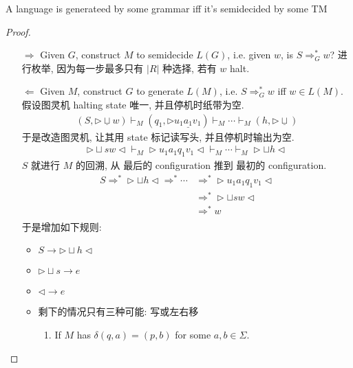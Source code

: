 \begin{theorem}
    A language is generateed by some grammar iff it's semidecided by some TM
\end{theorem}
\begin{proof}\quad
    \begin{itemize}
        \item [$\Rightarrow$] Given $G$, construct $M$ to semidecide $L(G)$, i.e. given $w$, is $S\Rightarrow_G^* w$?
        \subitem 进行枚举, 因为每一步最多只有 $|R|$ 种选择, 若有 $w$ halt. 
        \item [$\Leftarrow$] Given $M$, construct $G$ to generate $L(M)$, i.e. $S\Rightarrow_G^* w$ iff $w\in L(M)$. 
        \subitem 假设图灵机 halting state 唯一, 并且停机时纸带为空. 
        \begin{align*}
            (S,\triangleright \underline{\sqcup}w)\vdash_M (q_1, \triangleright u_1 \underline{a_1} v_1)\vdash_M \cdots \vdash_M (h, \triangleright \underline{\sqcup})
        \end{align*}
        于是改造图灵机, 让其用 state 标记读写头, 并且停机时输出为空. 
        \begin{align*}
            \triangleright \sqcup sw\triangleleft \vdash_M \triangleright u_1 a_1 q_1 v_1\triangleleft \vdash_M \cdots \vdash_M \triangleright\sqcup h\triangleleft
        \end{align*}
        \subitem $S$ 就进行 $M$ 的回溯, 从 最后的 configuration 推到 最初的 configuration. 
        \begin{align*}
            S\Rightarrow^* \triangleright \sqcup h \triangleleft 
            \Rightarrow^* \cdots 
            &\Rightarrow^* \triangleright u_1 a_1q_1 v_1\triangleleft \\
            &\Rightarrow^* \triangleright \sqcup sw\triangleleft\\
            &\Rightarrow^* w\\
        \end{align*}
        \subitem 于是增加如下规则: 
        \begin{itemize}
            \item $S\to  \triangleright \sqcup h \triangleleft $
            \item $\triangleright \sqcup s\to e$
            \item $\triangleleft \to e$
            \item 剩下的情况只有三种可能: 写或左右移
            \begin{enumerate}
                \item If $M$ has $\delta(q, a)=(p,b)$ for some $a, b\in \Sigma$. 

\end{enumerate}
\end{itemize}
\end{itemize}
\end{proof}
